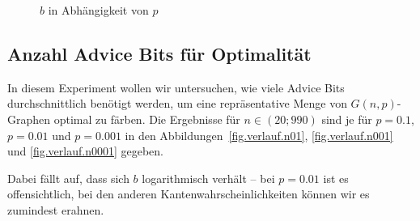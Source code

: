 \documentclass[11pt,abstracton]{scrreprt} %
\theoremstyle{definition}
\begin{document}
\begin{figure}
\caption{$b$ in Abhängigkeit von $p$}
\label{fig.verlauf.b}
\centering




\end{figure}



\subsection{Anzahl Advice Bits für Optimalität}

In diesem Experiment wollen wir untersuchen, wie viele Advice Bits durchschnittlich benötigt werden, um eine repräsentative Menge von $G(n,p)$-Graphen optimal zu färben. Die Ergebnisse für $n \in (20;990)$ sind je für $p = 0.1$, $p=0.01$ und $p = 0.001$ in den Abbildungen~\ref{fig.verlauf.n01}, \ref{fig.verlauf.n001} und \ref{fig.verlauf.n0001} gegeben.

Dabei fällt auf, dass sich $b$ logarithmisch verhält -- bei $p = 0.01$ ist es offensichtlich, bei den anderen Kantenwahrscheinlichkeiten können wir es zumindest erahnen.
\end{document}
